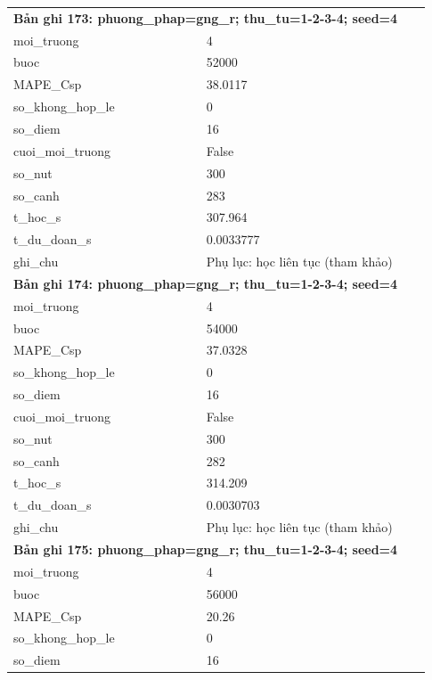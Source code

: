 \begin{longtable}{p{0.43\linewidth}p{0.50\linewidth}}
\midrule
\multicolumn{2}{p{0.95\linewidth}}{\textbf{Bản ghi 173: phuong\_phap=gng\_r; thu\_tu=1-2-3-4; seed=4}} \\
moi\_\allowbreak truong & 4 \\
buoc & 52000 \\
MAPE\_\allowbreak Csp & 38.0117 \\
so\_\allowbreak khong\_\allowbreak hop\_\allowbreak le & 0 \\
so\_\allowbreak diem & 16 \\
cuoi\_\allowbreak moi\_\allowbreak truong & False \\
so\_\allowbreak nut & 300 \\
so\_\allowbreak canh & 283 \\
t\_\allowbreak hoc\_\allowbreak s & 307.964 \\
t\_\allowbreak du\_\allowbreak doan\_\allowbreak s & 0.0033777 \\
ghi\_\allowbreak chu & Phụ lục: học liên tục (tham khảo) \\
\midrule
\multicolumn{2}{p{0.95\linewidth}}{\textbf{Bản ghi 174: phuong\_phap=gng\_r; thu\_tu=1-2-3-4; seed=4}} \\
moi\_\allowbreak truong & 4 \\
buoc & 54000 \\
MAPE\_\allowbreak Csp & 37.0328 \\
so\_\allowbreak khong\_\allowbreak hop\_\allowbreak le & 0 \\
so\_\allowbreak diem & 16 \\
cuoi\_\allowbreak moi\_\allowbreak truong & False \\
so\_\allowbreak nut & 300 \\
so\_\allowbreak canh & 282 \\
t\_\allowbreak hoc\_\allowbreak s & 314.209 \\
t\_\allowbreak du\_\allowbreak doan\_\allowbreak s & 0.0030703 \\
ghi\_\allowbreak chu & Phụ lục: học liên tục (tham khảo) \\
\midrule
\multicolumn{2}{p{0.95\linewidth}}{\textbf{Bản ghi 175: phuong\_phap=gng\_r; thu\_tu=1-2-3-4; seed=4}} \\
moi\_\allowbreak truong & 4 \\
buoc & 56000 \\
MAPE\_\allowbreak Csp & 20.26 \\
so\_\allowbreak khong\_\allowbreak hop\_\allowbreak le & 0 \\
so\_\allowbreak diem & 16 \\

\end{longtable}
